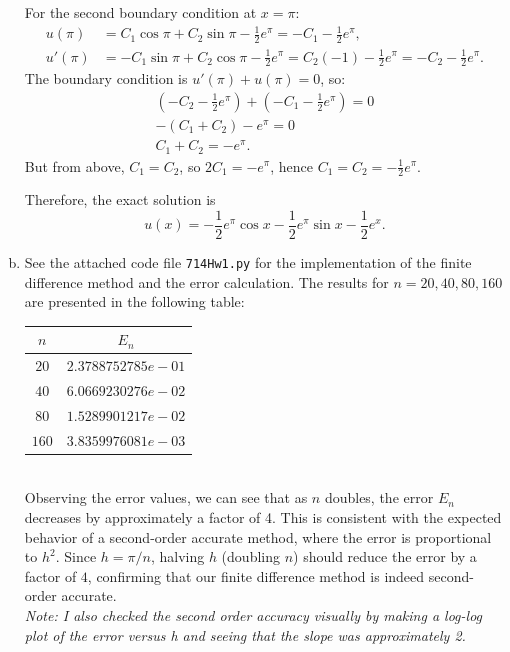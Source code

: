 \documentclass{article}
\begin{document}
\begin{enumerate}[(a)]
        For the second boundary condition at $x = \pi$:
        \begin{align*}
        u(\pi) &= C_1 \cos \pi + C_2 \sin \pi - \tfrac{1}{2} e^{\pi} = -C_1 - \tfrac{1}{2} e^{\pi}, \\
        u'(\pi) &= -C_1 \sin \pi + C_2 \cos \pi - \tfrac{1}{2} e^{\pi} = C_2 (-1) - \tfrac{1}{2} e^{\pi} = -C_2 - \tfrac{1}{2} e^{\pi}.
        \end{align*}
        The boundary condition is $u'(\pi) + u(\pi) = 0$, so:
        \begin{align*}
        (-C_2 - \tfrac{1}{2} e^{\pi}) + (-C_1 - \tfrac{1}{2} e^{\pi}) = 0 \\
        -(C_1 + C_2) - e^{\pi} = 0 \\
        C_1 + C_2 = -e^{\pi}.
        \end{align*}
        But from above, $C_1 = C_2$, so $2C_1 = -e^{\pi}$, hence $C_1 = C_2 = -\frac{1}{2} e^{\pi}$.

        Therefore, the exact solution is
        \begin{equation*}
        u(x) = -\frac{1}{2} e^{\pi} \cos x - \frac{1}{2} e^{\pi} \sin x - \frac{1}{2} e^{x}.
        \end{equation*}
  \item See the attached code file \texttt{714Hw1.py} for the implementation of the finite difference method and the error calculation. The results for $n=20,40,80,160$ are presented in the following table:
  \begin{tabular}{| c | c |}
    \hline 
    $n$ & $E_n$ \\ \hline
    $20$ & $2.3788752785 e-01$ \\
    $40$ & $6.0669230276e-02$ \\
    $80$ & $1.5289901217e-02$ \\
    $160$ & $3.8359976081e-03$ \\
    \hline
  \end{tabular}
  \\
  Observing the error values, we can see that as $n$ doubles, the error $E_n$ decreases by approximately a factor of 4. This is consistent with the expected behavior of a second-order accurate method, where the error is proportional to $h^2$. Since $h = \pi/n$, halving $h$ (doubling $n$) should reduce the error by a factor of $4$, confirming that our finite difference method is indeed second-order accurate. \\
  \textit{Note: I also checked the second order accuracy visually by making a log-log plot of the error versus h and seeing that the slope was approximately 2.}
\end{enumerate}
\end{document}
